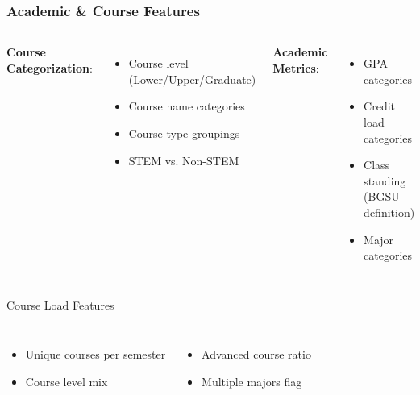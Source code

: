 \documentclass{beamer}
\begin{document}
\begin{frame}
\frametitle{Academic \& Course Features}
    \begin{columns}
        \textbf{Course Categorization}:
            \begin{itemize}
            \item Course level (Lower/Upper/Graduate)
            \item Course name categories
            \item Course type groupings
            \item STEM vs. Non-STEM
            \end{itemize}
            
        \textbf{Academic Metrics}:
            \begin{itemize}
            \item GPA categories
            \item Credit load categories
            \item Class standing (BGSU definition)
            \item Major categories
            \end{itemize}
    \end{columns}

    \begin{block}{Course Load Features}
        \begin{columns}[T]
            \begin{itemize}
            \item Unique courses per semester
            \item Course level mix
            \end{itemize}
            
            \begin{itemize}
            \item Advanced course ratio
            \item Multiple majors flag
            \end{itemize}
        \end{columns}
    \end{block}
\end{frame}
\end{document}
